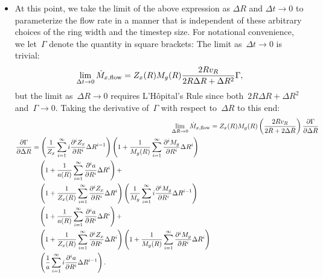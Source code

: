 \documentclass[main.tex]{subfiles}
\begin{document}
\begin{itemize}
	\item At this point, we take the limit of the above expression as
	$\Delta R$ and $\Delta t \rightarrow 0$ to parameterize the flow rate in a
	manner that is independent of these arbitrary choices of the ring width and
	the timestep size.
	For notational convenience, we let~$\Gamma$ denote the quantity in square
	brackets:
	The limit as~$\Delta t \rightarrow 0$ is trivial:
	\begin{equation}
	\lim_{\Delta t \rightarrow 0} \dot{M}_{x,\text{flow}} = Z_x(R) M_g(R)
	\frac{2 R v_R}{2 R \Delta R + \Delta R^2} \Gamma,
	\end{equation}
	but the limit as~$\Delta R \rightarrow 0$ requires L'H\^opital's Rule since
	both~$2 R \Delta R + \Delta R^2$ and~$\Gamma \rightarrow 0$.
	Taking the derivative of~$\Gamma$ with respect to~$\Delta R$ to this end:
	\begin{subequations}\begin{align}
	\lim_{\Delta R \rightarrow 0} \dot{M}_{x,\text{flow}} &=
	Z_x(R) M_g(R) \left( \frac{2 R v_R}{2R + 2 \Delta R} \right)
	\frac{\partial \Gamma}{\partial \Delta R}
	\\
	\begin{split}
	\frac{\partial \Gamma}{\partial \Delta R} &=
	\left(\frac{1}{Z_x} \sum_{i = 1}^\infty i
	\frac{\partial^i Z_x}{\partial R^i} \Delta R^{i - 1}\right)
	\left(1 + \frac{1}{M_g(R)}
	\sum_{i = 1}^\infty \frac{\partial^i M_g}{\partial R^i} \Delta R^i\right)
	\\
	&\quad
	\left(1 + \frac{1}{a(R)}
	\sum_{i = 1}^\infty \frac{\partial^i a}{\partial R^i} \Delta R^i\right) +
	\\
	&\quad
	\left(1 + \frac{1}{Z_x(R)}
	\sum_{i = 1}^\infty \frac{\partial^i Z_x}{\partial R^i} \Delta R^i\right)
	\left(\frac{1}{M_g} \sum_{i = 1}^\infty i
	\frac{\partial^i M_g}{\partial R^i} \Delta R^{i - 1}\right)
	\\
	&\quad
	\left(1 + \frac{1}{a(R)}
	\sum_{i = 1}^\infty \frac{\partial^i a}{\partial R^i} \Delta R^i\right) +
	\\
	&\quad
	\left(1 + \frac{1}{Z_x(R)}
	\sum_{i = 1}^\infty \frac{\partial^i Z_x}{\partial R^i} \Delta R^i\right)
	\left(1 + \frac{1}{M_g(R)}
	\sum_{i = 1}^\infty \frac{\partial^i M_g}{\partial R^i} \Delta R^i\right)
	\\
	&\quad
	\left(\frac{1}{a} \sum_{i = 1}^\infty i \frac{\partial^i a}{\partial R^i}
	\Delta R^{i - 1}\right).
	\end{split}
	\end{align}\end{subequations}

\end{itemize}
\end{document}
